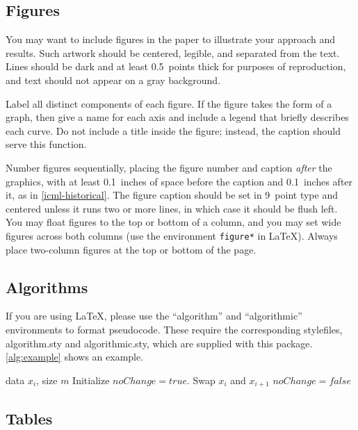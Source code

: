 \documentclass{article}
\theoremstyle{plain}
\theoremstyle{definition}
\theoremstyle{remark}
\begin{document}
\subsection{Figures}

You may want to include figures in the paper to illustrate
your approach and results. Such artwork should be centered,
legible, and separated from the text. Lines should be dark and at
least 0.5~points thick for purposes of reproduction, and text should
not appear on a gray background.

Label all distinct components of each figure. If the figure takes the
form of a graph, then give a name for each axis and include a legend
that briefly describes each curve. Do not include a title inside the
figure; instead, the caption should serve this function.

Number figures sequentially, placing the figure number and caption
\emph{after} the graphics, with at least 0.1~inches of space before
the caption and 0.1~inches after it, as in
\cref{icml-historical}. The figure caption should be set in
9~point type and centered unless it runs two or more lines, in which
case it should be flush left. You may float figures to the top or
bottom of a column, and you may set wide figures across both columns
(use the environment \texttt{figure*} in \LaTeX). Always place
two-column figures at the top or bottom of the page.

\subsection{Algorithms}

If you are using \LaTeX, please use the ``algorithm'' and ``algorithmic''
environments to format pseudocode. These require
the corresponding stylefiles, algorithm.sty and
algorithmic.sty, which are supplied with this package.
\cref{alg:example} shows an example.

\begin{algorithm}[tb]
   \caption{Bubble Sort}
   \label{alg:example}
\begin{algorithmic}
    data $x_i$, size $m$
   \REPEAT
   \STATE Initialize $noChange = true$.
   \STATE Swap $x_i$ and $x_{i+1}$
   \STATE $noChange = false$
   \ENDIF
   \ENDFOR
\end{algorithmic}
\end{algorithm}

\subsection{Tables}
\end{document}
